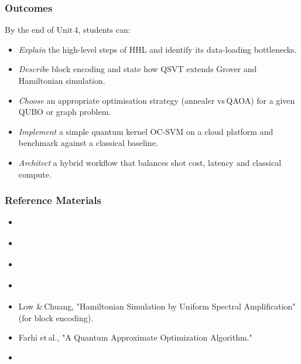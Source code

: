 

\subsubsection{Outcomes}

By the end of Unit 4, students can:
\begin{itemize}
	\item \emph{Explain} the high-level steps of HHL and identify its data-loading bottlenecks.
	
	\item \emph{Describe} block encoding and state how QSVT extends Grover and Hamiltonian simulation.
	
	\item \emph{Choose} an appropriate optimisation strategy (annealer vs QAOA) for a given QUBO or graph problem.
	
	\item \emph{Implement} a simple quantum kernel OC-SVM on a cloud platform and benchmark against a classical baseline.
	
	\item \emph{Architect} a hybrid workflow that balances shot cost, latency and classical compute.
\end{itemize}

\subsubsection{Reference Materials}
\begin{itemize}
	\item \citeauthor{Lipton:2021} 
	\item \citeauthor{Harrow:2009} 
	\item \citeauthor{Abhijith:2022} 
	\item \citeauthor{Dalzell:2023} 
	\item Low \& Chuang, "Hamiltonian Simulation by Uniform Spectral Amplification" (for block encoding).
	\item Farhi et al., "A Quantum Approximate Optimization Algorithm."
	\item \citeauthor{Havlicek:2019} 
\end{itemize}

